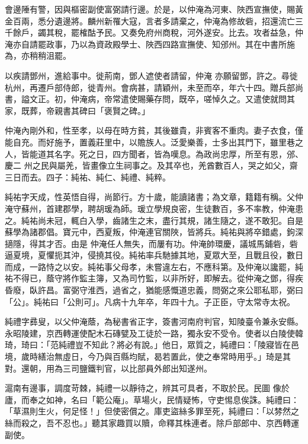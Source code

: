 \begin{pinyinscope}
 會邊陲有警，因與樞密副使富弼請行邊。於是，以仲淹為河東、陜西宣撫使，賜黃金百兩，悉分遺邊將。麟州新罹大寇，言者多請棄之，仲淹為修故砦，招還流亡三千餘戶，蠲其稅，罷榷酤予民。又奏免府州商稅，河外遂安。比去。攻者益急，仲淹亦自請罷政事，乃以為資政殿學士、陜西四路宣撫使、知邠州。其在中書所施為，亦稍稍沮罷。



 以疾請鄧州，進給事中。徙荊南，鄧人遮使者請留，仲淹
 亦願留鄧，許之。尋徙杭州，再遷戶部侍郎，徙青州。會病甚，請穎州，未至而卒，年六十四。贈兵部尚書，謚文正。初，仲淹病，帝常遣使賜藥存問，既卒，嗟悼久之。又遣使就問其家，既葬，帝親書其碑曰「褒賢之碑。」



 仲淹內剛外和，性至孝，以母在時方貧，其後雖貴，非賓客不重肉。妻子衣食，僅能自充。而好施予，置義莊里中，以贍族人。泛愛樂善，士多出其門下，雖里巷之人，皆能道其名字。死之日，四方聞者，皆為嘆息。為政尚忠厚，所至有恩，邠、慶二
 州之民與屬羌，皆畫像立生祠事之。及其卒也，羌酋數百人，哭之如父，齋三日而去。四子：純祐、純仁、純禮、純粹。



 純祐字天成，性英悟自得，尚節行。方十歲，能讀諸書；為文章，籍籍有稱。父仲淹守蘇州，首建郡學，聘胡瑗為師。瑗立學規良密，生徒數百，多不率教，仲淹患之。純祐尚未冠，輒白入學，齒諸生之末，盡行其規，諸生隨之，遂不敢犯。自是蘇學為諸郡倡。寶元中，西夏叛，仲淹連官關陜，皆將兵。純祐與將卒錯處，鉤深擿隱，得其才否。由是
 仲淹任人無失，而屢有功。仲淹帥環慶，議城馬鋪砦，砦逼夏境，夏懼扼其沖，侵撓其役。純祐率兵馳據其地，夏眾大至，且戰且役，數日而成，一路恃之以安。純祐事父母孝，未嘗違左右，不應科第。及仲淹以讒罷，純祐不得已，蔭守將作監主簿，又為司竹監，以非所好，即解去。從仲淹之鄧，得疾昏廢，臥許昌。富弼守淮西，過省之，猶能感慨道忠義，問弼之來公耶私耶，弼曰「公」。純祐曰「公則可」。凡病十九年卒，年四十九。子正臣，守太常寺太祝。



 純禮字彞叟，以父仲淹蔭，為秘書省正字，簽書河南府判官，知陵臺令兼永安縣。永昭陵建，京西轉運使配木石磚甓及工徒於一路，獨永安不受令。使者以白陵使韓琦，琦曰：「范純禮豈不知此？將必有說。」他日，眾質之，純禮曰：「陵寢皆在邑境，歲時繕治無虛日，今乃與百縣均賦，曷若置此，使之奉常時用乎。」琦是其對。還朝，用為三司鹽鐵判官，以比部員外郎出知遂州。



 滬南有邊事，調度苛棘，純禮一以靜待之，辨其可具者，不取於民。民圖
 像於廬，而奉之如神，名曰「範公庵」。草場火，民情疑怖，守吏惕息俟誅。純禮曰：「草濕則生火，何足怪！」但使密償之。庫吏盜絲多罪至死，純禮曰：「以棼然之絲而殺之，吾不忍也。」聽其家趣買以贖，命釋其株連者。除戶部郎中、京西轉運副使。




\end{pinyinscope}
